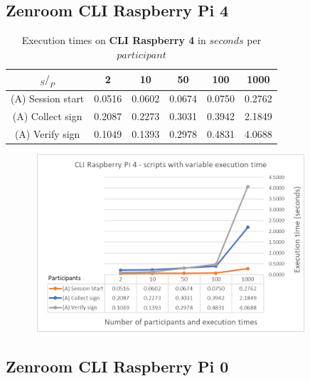 \documentclass[twocolumn]{article}
\begin{document}
\subsection*{Zenroom CLI Raspberry Pi 4}


\begin{table}[h!]
  \begin{center}
    \caption{Execution times on \textbf{CLI Raspberry 4} in $seconds$ per $participant$}
      \label{tab:table1}
        \begin{tabular} {c|c|c|c|c|c}
          \toprule
           \textbf{$_S / _P$} & \textbf{2} & \textbf{10} & \textbf{50} & \textbf{100} & \textbf{1000} \\
          \midrule
          (A) Session start & 0.0516 & 0.0602 & 0.0674 & 0.0750 & 0.2762 \\
          (A) Collect sign & 0.2087 & 0.2273 & 0.3031 & 0.3942 & 2.1849 \\
          (A) Verify sign & 0.1049 & 0.1393 & 0.2978 & 0.4831 & 4.0688 \\
      \bottomrule %
    \end{tabular}
  \end{center}
\end{table}

\begin{figure}[h!]
    \centering
    \includegraphics[width=4in, height=2.6in]{graphs/CLIRaspi4.png}
    \label{fig:galaxy}
\end{figure}



\pagebreak
\newpage

\subsection*{Zenroom CLI Raspberry Pi 0}
\end{document}
